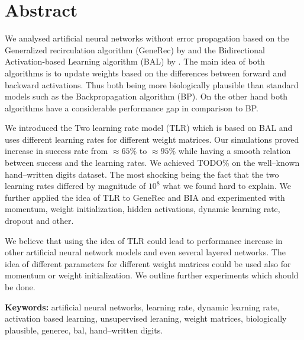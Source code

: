 
\section*{Abstract}

We analysed artificial neural networks without error propagation based on the Generalized recirculation algorithm (GeneRec) by \citet{o1996bio} and the Bidirectional Activation-based Learning algorithm (BAL) by \citet{farkas2013bal}. The main idea of both algorithms is to update weights based on the differences between forward and backward activations. Thus both being more biologically plausible than standard models such as the Backpropagation algorithm (BP). On the other hand both algorithms have a considerable performance gap in comparison to BP.

We introduced the Two learning rate model (TLR) which is based on BAL and uses different learning rates for different weight matrices. Our simulations proved increase in success rate from $\approx 65\%$ to $\approx 95\%$ while having a smooth relation between success and the learning rates. We achieved TODO\% on the well--known hand--written digits dataset. The most shocking being the fact that the two learning rates differed by magnitude of $10^8$ what we found hard to explain. We further applied the idea of TLR to GeneRec and BIA and experimented with momentum, weight initialization, hidden activations, dynamic learning rate, dropout and other. 

We believe that using the idea of TLR could lead to performance increase in other artificial neural network models and even several layered networks. The idea of different parameters for different weight matrices could be used also for momentum or weight initialization. We outline further experiments which should be done. 

\begin{flushleft}
  \textbf{Keywords:} artificial neural networks, learning rate, dynamic learning rate, activation based learning, unsupervised leraning, weight matrices, biologically plausible, generec, bal, hand--written digits. 
\end{flushleft}


